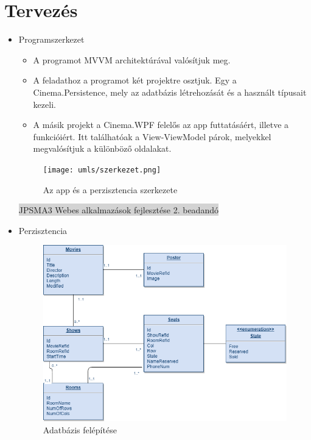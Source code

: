 \documentclass[11pt,a4paper]{article}
\begin{document}
\section{Tervezés}
\begin{itemize}
\item Programszerkezet
\begin{itemize}
	\item A programot MVVM architektúrával valósítjuk meg.
	\item A feladathoz a programot két projektre osztjuk. Egy a Cinema.Persistence, mely
	az adatbázis létrehozását és a használt típusait kezeli.
	\item A másik projekt a Cinema.WPF felelős az app futtatásáért, illetve a funkcióiért.
	Itt találhatóak a View-ViewModel párok, melyekkel megvalósítjuk a különböző oldalakat.
\end{itemize}
\begin{figure}[h]
\centering
\texttt{[image: umls/szerkezet.png]}
\caption{Az app és a perzisztencia szerkezete}
\end{figure}

\newpage
\begin{center}
\colorbox{lightgray}{{\large JPSMA3} \hspace{3cm} {\large Webes alkalmazások fejlesztése 2. beadandó} \hspace{5cm} \thepage}
\end{center}

\item Perzisztencia
\begin{figure}[h]
	\centering
	\includegraphics[width=12cm]{umls/Entity.png}
	\caption{Adatbázis felépítése}
\end{figure}


\end{itemize}
\end{document}
